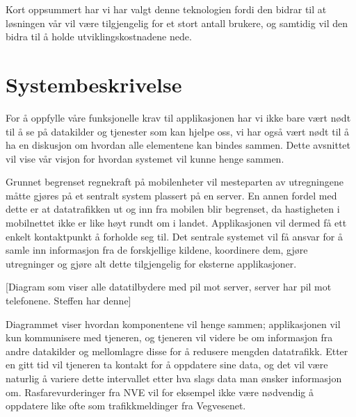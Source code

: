 \documentclass[a4paper,norsk,oneside]{book}
\begin{document}
Kort oppsummert har vi har valgt denne teknologien fordi den bidrar til at løsningen vår vil være tilgjengelig for et stort antall brukere, og samtidig vil den bidra til å holde utviklingskostnadene nede.

%
%

\section{Systembeskrivelse}
\label{sec:Systembeskrivelse}

For å oppfylle våre funksjonelle krav til applikasjonen har vi ikke bare vært nødt til å se på datakilder og tjenester som kan hjelpe oss, vi har også vært nødt til å ha en diskusjon om hvordan alle elementene kan bindes sammen. Dette avsnittet vil vise vår visjon for hvordan systemet vil kunne henge sammen.

Grunnet begrenset regnekraft på mobilenheter vil mesteparten av utregningene måtte gjøres på et sentralt system plassert på en server. En annen fordel med dette er at datatrafikken ut og inn fra mobilen blir begrenset, da hastigheten i mobilnettet ikke er like høyt rundt om i landet. Applikasjonen vil dermed få ett enkelt kontaktpunkt å forholde seg til. Det sentrale systemet vil få ansvar for å samle inn informasjon fra de forskjellige kildene, koordinere dem, gjøre utregninger og gjøre alt dette tilgjengelig for eksterne applikasjoner.

[Diagram som viser alle datatilbydere med pil mot server, server har pil mot telefonene. Steffen har denne]

Diagrammet viser hvordan komponentene vil henge sammen; applikasjonen vil kun kommunisere med tjeneren, og tjeneren vil videre be om informasjon fra andre datakilder og mellomlagre disse for å redusere mengden datatrafikk. Etter en gitt tid vil tjeneren ta kontakt for å oppdatere sine data, og det vil være naturlig å variere dette intervallet etter hva slags data man ønsker informasjon om. Rasfarevurderinger fra NVE vil for eksempel ikke være nødvendig å oppdatere like ofte som trafikkmeldinger fra Vegvesenet.
\end{document}
